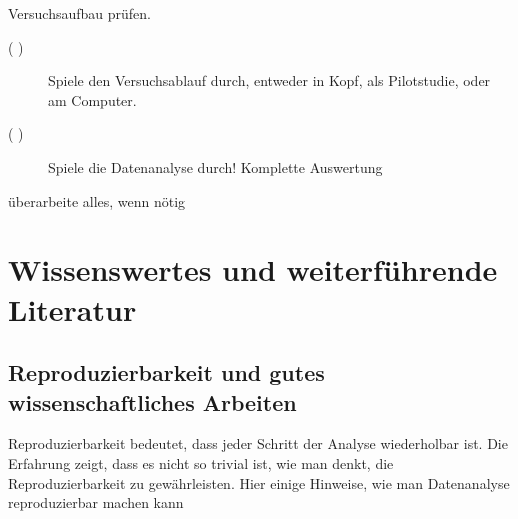 \documentclass[a4paper,twoside]{tufte-book}\usepackage[]{graphicx}\usepackage[]{color}
\begin{document}
\begin{fullwidth}
\begin{mdframed}[backgroundcolor=black!10,rightline=false,leftline=false]
\begin{description}
\begin{description}
  \end{description}
  
\item[( )] Versuchsaufbau prüfen.
  
  \begin{description}
  
  \item[( )] Spiele den Versuchsablauf durch, entweder in Kopf, als Pilotstudie, oder am Computer. 
  
  \item[( )] Spiele die Datenanalyse durch! Komplette Auswertung

  \end{description}


\item[( )] überarbeite alles, wenn nötig

\end{description}

\end{mdframed}
\end{fullwidth}


\chapter{Wissenswertes und weiterführende Literatur}

\section{Reproduzierbarkeit und gutes wissenschaftliches Arbeiten}

Reproduzierbarkeit bedeutet, dass jeder Schritt der Analyse wiederholbar ist. Die Erfahrung zeigt, dass es nicht so trivial ist, wie man denkt, die Reproduzierbarkeit zu gewährleisten. Hier einige Hinweise, wie man Datenanalyse reproduzierbar machen kann
\end{document}
